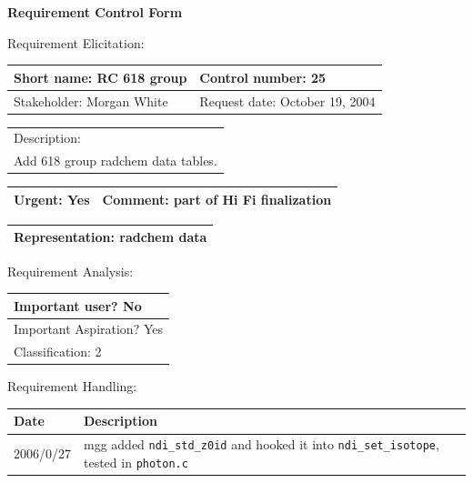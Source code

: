 \begin{center}\Large\bf
Requirement Control Form
\end{center}
\vspace{24pt}

Requirement Elicitation:

\begin{tabular}{|p{211pt}|p{211pt}|} \hline
Short name: RC 618 group & Control number: 25\\ \hline
Stakeholder: Morgan White & Request date: October 19, 2004\\
\end{tabular}
\begin{tabular}{|p{433pt}|} \hline
Description: \\ 
Add 618 group radchem data tables. \\
\hline
\end{tabular} 
\begin{tabular}{|p{211pt}|p{211pt}|} \hline
Urgent: Yes & Comment: part of Hi Fi finalization\\ \hline
\end{tabular}

\vspace{12pt}

\begin{tabular}{|p{433pt}|} \hline
Representation: radchem data \\ \hline
\end{tabular}
\vspace{24pt}

Requirement Analysis:

\begin{tabular}{|p{433pt}|} \hline
Important user? No \\ \hline
Important Aspiration? Yes \\ \hline
Classification: 2 \\ \hline
\end{tabular}
\vspace{24pt}

Requirement Handling:

\begin{tabular}{|p{72pt}|p{351pt}|} \hline
Date & Description \\ \hline
2006/0/27 & mgg added \texttt{ndi\_std\_z0id} and hooked it into
\texttt{ndi\_set\_isotope}, tested in \texttt{photon.c} \\ \hline 
\end{tabular}

